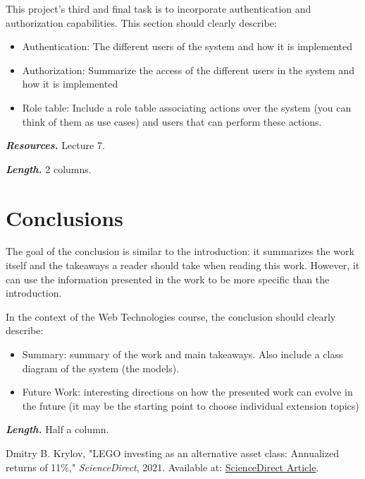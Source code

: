 \documentclass[letterpaper,twocolumn]{article}
\newcommand{\myparagraph}[1]{\vspace{0.1cm}\noindent \textbf{\textit{#1.}}}
\begin{document}
This project's third and final task is to incorporate authentication and authorization capabilities.
This section should clearly describe:

\begin{itemize}
    \item Authentication: The different users of the system and how it is implemented
    \item Authorization: Summarize the access of the different users in the system and how it is implemented
    \item Role table: Include a role table associating actions over the system (you can think of them as use cases) and users that can perform these actions.
\end{itemize}

\myparagraph{Resources} Lecture 7.

\myparagraph{Length} 2 columns.

\section{Conclusions}

The goal of the conclusion is similar to the introduction: it summarizes the work itself and the takeaways a reader should take when reading this work. However, it can use the information presented in the work to be more specific than the introduction.

In the context of the Web Technologies course, the conclusion should clearly describe:

\begin{itemize}
    \item Summary: summary of the work and main takeaways. Also include a class diagram of the system (the models).
    \item Future Work: interesting directions on how the presented work can evolve in the future (it may be the starting point to choose individual extension topics)
\end{itemize}

\myparagraph{Length} Half a column.

\begin{thebibliography}{9}

    Dmitry B. Krylov, "LEGO investing as an alternative asset class: Annualized returns of 11\%," 
    \textit{ScienceDirect}, 2021. Available at: \href{https://www.sciencedirect.com/science/article/abs/pii/S0275531921001604?via%3Dihub}{ScienceDirect Article}.
    
\end{thebibliography}
\end{document}
